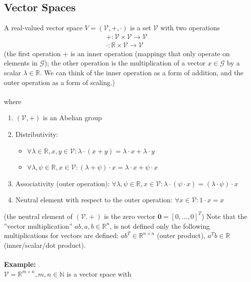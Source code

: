\documentclass{report}
\begin{document}
\subsection{Vector Spaces} %
A real-valued vector space $V=(\mathcal{V},+,\cdot)$ is a set $\mathcal{V}$ with two operations
\begin{align*}
+:\mathcal{V\times V\to V}\\
\cdot:\mathbb{R}\times\mathcal{V}\to\mathcal{V}
\end{align*}
(the first operation + is an inner operation (mappings that only operate on elements in $\mathcal{G}$); the 
other operation is the multiplication of a vector $x\in\mathcal{G}$ by a scalar $\lambda\in\mathbb{R}$. 
We can think of the inner operation as a form of addition,
and the outer operation as a form of scaling.)\\
\vspace{1mm}\\
where
\begin{enumerate}
\item$\mathcal{(V,+)}$ is an Abelian group
\item Distributivity:
\begin{itemize}
\item$\forall\lambda\in\mathbb{R},x,y\in\mathcal{V}:
\lambda\cdot(x+y)=\lambda\cdot x+\lambda\cdot y$
\item$\forall\lambda,\psi\in\mathbb{R},x\in\mathcal{V}:
(\lambda+\psi)\cdot x=\lambda\cdot x+\psi\cdot x$
\end{itemize}
\item Associativity (outer operation):
$\forall\lambda,\psi\in\mathbb{R},x\in\mathcal{V}
:\lambda\cdot(\psi\cdot x)=(\lambda\cdot\psi)\cdot x$
\item Neutral element with respect to the outer operation:
$\forall x\in\mathcal{V}:1\cdot x=x$
\end{enumerate}
(the neutral element of $(\mathcal{V.+})$ is the zero vector $\mathbf{0}=[0,\ldots,0]^T$) Note that
the ''vector multiplication'' $ab,a,b\in\mathbb{R}^n$, is not defined only the following
multiplications for vectors are defined: $ab^T\in\mathbb{R}^{n\times n}$ 
(outer product), $a^Tb\in\mathbb{R}$
(inner/scalar/dot product).\\
\vspace{1mm}\\
\textbf{Example:}\\
$\mathcal{V}=\mathbb{R}^{m\times n},m,n\in\mathbb{N}$ is a
vector space with
\end{document}
